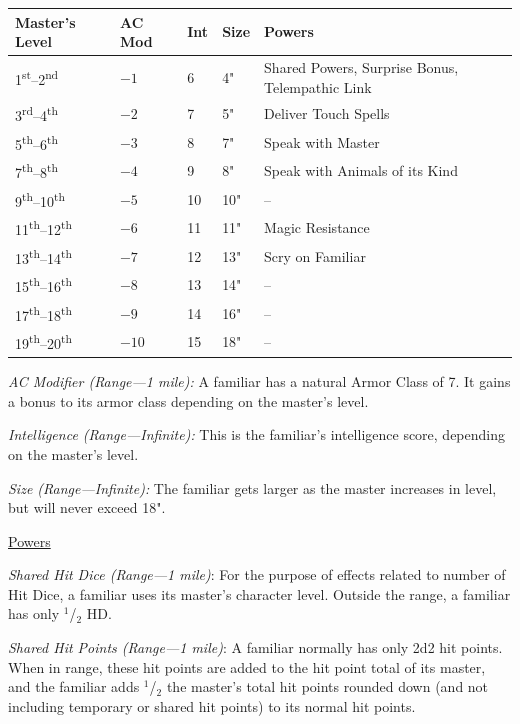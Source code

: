 \begin{multicols}{2}
\noindent
\begin{tabular}{|p{}|p{}|p{}|p{}|p{}|}
\hline
Master's Level	& AC Mod	& Int	& Size	& Powers \\
\hline\hline
\rowcolor[gray]{.9}1\textsuperscript{st}--2\textsuperscript{nd}	& $-1$	& 6		& 4"	& Shared Powers, Surprise Bonus, Telempathic Link \\
3\textsuperscript{rd}--4\textsuperscript{th} 	& $-2$	& 7		& 5"	& Deliver Touch Spells \\
\rowcolor[gray]{.9}5\textsuperscript{th}--6\textsuperscript{th}	& $-3$	& 8		& 7"	& Speak with Master \\
7\textsuperscript{th}--8\textsuperscript{th}	& $-4$	& 9		& 8"	& Speak with Animals of its Kind \\
\rowcolor[gray]{.9}9\textsuperscript{th}--10\textsuperscript{th}	& $-5$	& 10	& 10"	& -- \\
11\textsuperscript{th}--12\textsuperscript{th}	& $-6$	& 11	& 11"	& Magic Resistance \\
\rowcolor[gray]{.9}13\textsuperscript{th}--14\textsuperscript{th}	& $-7$	& 12	& 13"	& Scry on Familiar \\
15\textsuperscript{th}--16\textsuperscript{th}	& $-8$	& 13	& 14"	& -- \\
\rowcolor[gray]{.9}17\textsuperscript{th}--18\textsuperscript{th}	& $-9$	& 14	& 16"	& -- \\
19\textsuperscript{th}--20\textsuperscript{th}	& $-10$	& 15	& 18"	& -- \\
\hline
\end{tabular}

\textit{AC Modifier (Range---1 mile):} A familiar has a natural Armor Class of 7.  It gains a bonus to its armor class depending on the master's level. 

\textit{Intelligence (Range---Infinite):} This is the familiar's intelligence score, depending on the master's level. 

\textit{Size (Range---Infinite):} The familiar gets larger as the master increases in level, but will never exceed 18".

\noindent \underline{Powers}

\textit{Shared Hit Dice (Range---1 mile)}: For the purpose of effects related to number of Hit Dice, a familiar uses its master's character level.  Outside the range, a familiar has only $^1$/$_2$ HD.

\textit{Shared Hit Points (Range---1 mile)}: A familiar normally has only 2d2 hit points.  When in range, these hit points are added to the hit point total of its master, and the familiar adds $^1$/$_2$ the master's total hit points rounded down (and not including temporary or shared hit points) to its normal hit points. 


\end{multicols}
